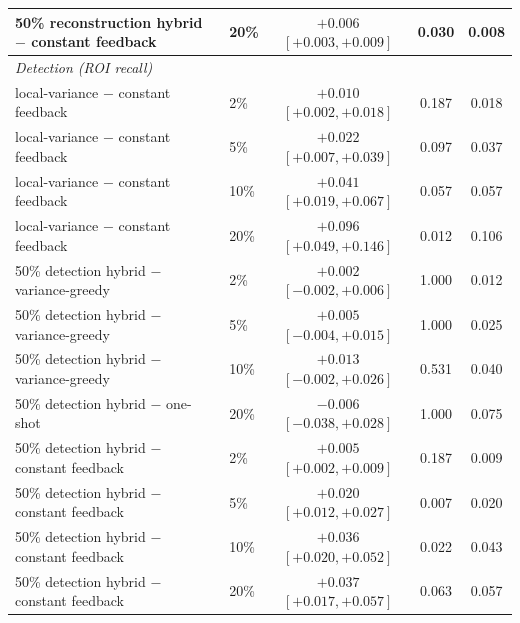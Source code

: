 \begin{tabular}{llccc}
50\% reconstruction hybrid $-$ constant feedback & 20\% & ${+}0.006$ $[{+}0.003, {+}0.009]$ & 0.030 & 0.008 \\
\midrule
\multicolumn{5}{l}{\emph{Detection (ROI recall)}} \\
local-variance $-$ constant feedback & 2\% & ${+}0.010$ $[{+}0.002, {+}0.018]$ & 0.187 & 0.018 \\
local-variance $-$ constant feedback & 5\% & ${+}0.022$ $[{+}0.007, {+}0.039]$ & 0.097 & 0.037 \\
local-variance $-$ constant feedback & 10\% & ${+}0.041$ $[{+}0.019, {+}0.067]$ & 0.057 & 0.057 \\
local-variance $-$ constant feedback & 20\% & ${+}0.096$ $[{+}0.049, {+}0.146]$ & 0.012 & 0.106 \\
50\% detection hybrid $-$ variance-greedy & 2\% & ${+}0.002$ $[-0.002, {+}0.006]$ & 1.000 & 0.012 \\
50\% detection hybrid $-$ variance-greedy & 5\% & ${+}0.005$ $[-0.004, {+}0.015]$ & 1.000 & 0.025 \\
50\% detection hybrid $-$ variance-greedy & 10\% & ${+}0.013$ $[-0.002, {+}0.026]$ & 0.531 & 0.040 \\
50\% detection hybrid $-$ one-shot & 20\% & $-0.006$ $[-0.038, {+}0.028]$ & 1.000 & 0.075 \\
50\% detection hybrid $-$ constant feedback & 2\% & ${+}0.005$ $[{+}0.002, {+}0.009]$ & 0.187 & 0.009 \\
50\% detection hybrid $-$ constant feedback & 5\% & ${+}0.020$ $[{+}0.012, {+}0.027]$ & 0.007 & 0.020 \\
50\% detection hybrid $-$ constant feedback & 10\% & ${+}0.036$ $[{+}0.020, {+}0.052]$ & 0.022 & 0.043 \\
50\% detection hybrid $-$ constant feedback & 20\% & ${+}0.037$ $[{+}0.017, {+}0.057]$ & 0.063 & 0.057 \\
\bottomrule
\end{tabular}